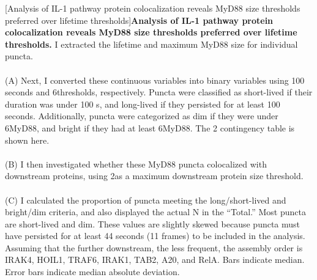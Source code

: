 \begin{centering}
\captionsetup{parbox=none}
[Analysis of IL-1 pathway protein colocalization reveals MyD88 size thresholds preferred over lifetime thresholds]{\textbf{Analysis of IL-1 pathway protein colocalization reveals MyD88 size thresholds preferred over lifetime thresholds.} I extracted the lifetime and maximum MyD88 size for individual puncta.
\\
\\
(A) Next, I converted these continuous variables into binary variables using 100 seconds and 6\times thresholds, respectively. Puncta were classified as short-lived if their duration was under 100 s, and long-lived if they persisted for at least 100 seconds. Additionally, puncta were categorized as dim if they were under 6\times MyD88, and bright if they had at least 6\times MyD88. The 2 contingency table is shown here.
\\
\\
(B) I then investigated whether these MyD88 puncta colocalized with downstream proteins, using 2\times as a maximum downstream protein size threshold.
\\
\\
(C) I calculated the proportion of puncta meeting the long/short-lived and bright/dim criteria, and also displayed the actual N in the “Total.” Most puncta are short-lived and dim. These values are slightly skewed because puncta must have persisted for at least 44 seconds (11 frames) to be included in the analysis. Assuming that the further downstream, the less frequent, the assembly order is IRAK4, HOIL1, TRAF6, IRAK1, TAB2, A20, and RelA. Bars indicate median. Error bars indicate median absolute deviation.
}
\end{centering}

